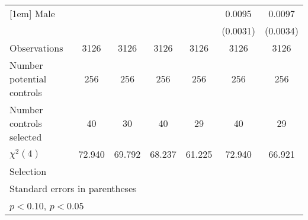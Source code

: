 {\begin{tabular}{l*{6}{c}}
[1em]
\hspace{3mm}Male    &                    &                    &                    &                    &      0.0095\sym{**}&      0.0097\sym{**}\\
                    &                    &                    &                    &                    &    (0.0031)        &    (0.0034)        \\
\hline
Observations        &        3126        &        3126        &        3126        &        3126        &        3126        &        3126        \\
Number potential controls&         256        &         256        &         256        &         256        &         256        &         256        \\
Number controls selected&          40        &          30        &          40        &          29        &          40        &          29        \\
$\chi^2(4)$         &      72.940        &      69.792        &      68.237        &      61.225        &      72.940        &      66.921        \\
Selection           &                    &                    &                    &                    &                    &                    \\
\hline\hline
\multicolumn{7}{l}{\footnotesize Standard errors in parentheses}\\
\multicolumn{7}{l}{\footnotesize \sym{*} \(p<0.10\), \sym{**} \(p<0.05\)}\\
\end{tabular}
}
